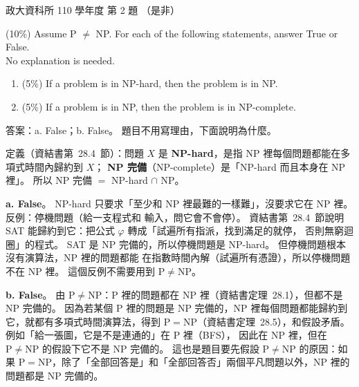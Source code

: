 \begin{pastexam}[label={px:nccu-110-dsa-02}]{政大資科所 110 學年度 第 2 題}
（是非）

(10\%) Assume P $\neq$ NP. For each of the following statements, answer True or False.\\
No explanation is needed.
\begin{enumerate}[label=\alph*.]
\item (5\%) If a problem is in NP-hard, then the problem is in NP.
\item (5\%) If a problem is in NP, then the problem is in NP-complete.
\end{enumerate}
\end{pastexam}

\begin{pastsoln}
答案：a. False；b. False。 題目不用寫理由，下面說明為什麼。

定義（資結書第~28.4~節）：問題 $X$ 是 \textbf{NP-hard}，是指 NP 裡每個問題都能在多項式時間內歸約到 $X$；
\textbf{NP 完備}（NP-complete）是「NP-hard 而且本身在 NP 裡」。 所以 NP 完備 $=$ NP-hard $\cap$ NP。

\textbf{a. False}。 NP-hard 只要求「至少和 NP 裡最難的一樣難」，沒要求它在 NP 裡。 反例：停機問題（給一支程式和
輸入，問它會不會停）。 資結書第~28.4~節說明 SAT 能歸約到它：把公式 $\varphi$ 轉成「試遍所有指派，找到滿足的就停，
否則無窮迴圈」的程式。 SAT 是 NP 完備的，所以停機問題是 NP-hard。 但停機問題根本沒有演算法，NP 裡的問題都能
在指數時間內解（試遍所有憑證），所以停機問題不在 NP 裡。 這個反例不需要用到 $\mathrm{P} \ne \mathrm{NP}$。

\textbf{b. False}。 由 $\mathrm{P} \ne \mathrm{NP}$：P 裡的問題都在 NP 裡（資結書定理~28.1），但都不是 NP 完備的。
因為若某個 P 裡的問題是 NP 完備的，NP 裡每個問題都能歸約到它，就都有多項式時間演算法，得到
$\mathrm{P} = \mathrm{NP}$（資結書定理~28.5），和假設矛盾。 例如「給一張圖，它是不是連通的」在 P 裡（BFS），
因此在 NP 裡，但在 $\mathrm{P} \ne \mathrm{NP}$ 的假設下它不是 NP 完備的。 這也是題目要先假設 $\mathrm{P} \ne
\mathrm{NP}$ 的原因：如果 $\mathrm{P} = \mathrm{NP}$，除了「全部回答是」和「全部回答否」兩個平凡問題以外，NP 裡的
問題都是 NP 完備的。
\end{pastsoln}
